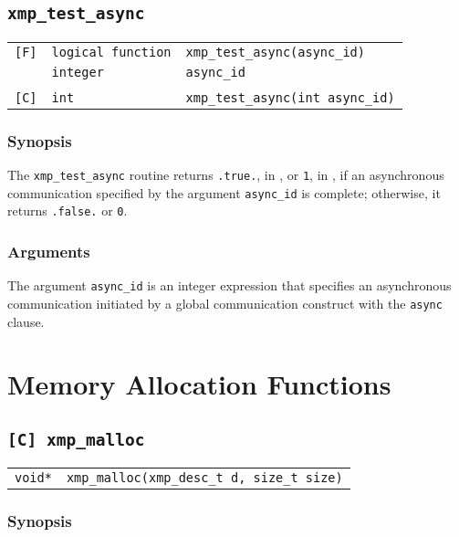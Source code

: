 \subsection{\tt xmp\_test\_async}

\begin{tabular}{lll}

\verb![F]!& {\tt logical function} & {\tt xmp\_test\_async(async\_id)}\\
          & {\tt integer} & {\tt async\_id}\\
          & & \\
\verb![C]!&  {\tt int} & {\tt  xmp\_test\_async(int async\_id)}

\end{tabular}

\subsubsection*{Synopsis}

The {\tt xmp\_test\_async} routine returns {\tt .true.}, in {\XMPF}, or
{\tt 1}, in {\XMPC}, if an asynchronous communication specified by the
argument {\tt async\_id} is complete; otherwise, it returns {\tt .false.}
or {\tt 0}.

\subsubsection*{Arguments}

The argument {\tt async\_id} is an integer expression that specifies an
asynchronous communication initiated by a global communication construct
with the {\tt async} clause.


\section{Memory Allocation Functions}

\subsection{\tt [C] xmp\_malloc} \label{subsec: xmp_malloc}

\begin{tabular}{ll}

{\tt void*} & {\tt xmp\_malloc(xmp\_desc\_t d, size\_t size)}

\end{tabular}

\subsubsection*{Synopsis}

